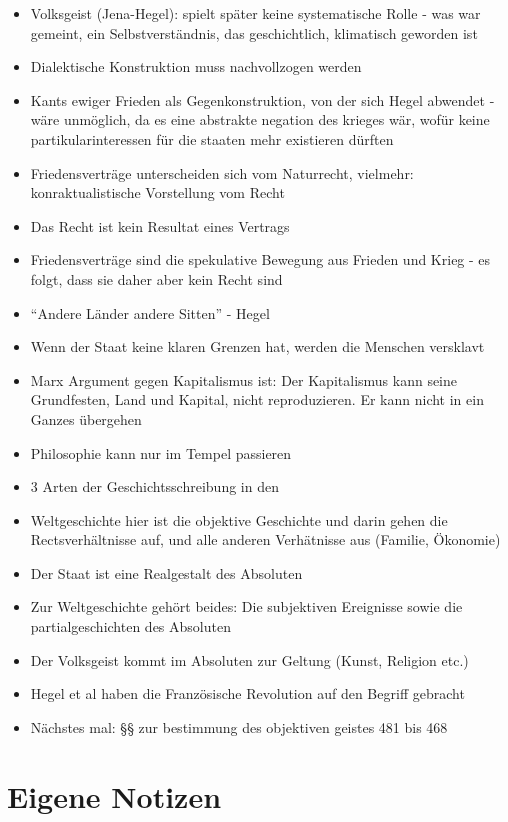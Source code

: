 \documentclass[emulatestandardclasses]{scrartcl}
\begin{document}
\begin{itemize}
  \item Volksgeist (Jena-Hegel): spielt später keine systematische Rolle - was war gemeint, ein Selbstverständnis, das geschichtlich, klimatisch geworden ist
  \item Dialektische Konstruktion muss nachvollzogen werden
  \item Kants ewiger Frieden als Gegenkonstruktion, von der sich Hegel abwendet - wäre unmöglich, da es eine abstrakte negation des krieges wär, wofür keine partikularinteressen für die staaten mehr existieren dürften
  \item Friedensverträge unterscheiden sich vom Naturrecht, vielmehr: konraktualistische Vorstellung vom Recht
  \item Das Recht ist kein Resultat eines Vertrags
  \item Friedensverträge sind die spekulative Bewegung aus Frieden und Krieg - es folgt, dass sie daher aber kein Recht sind
  \item "`Andere Länder andere Sitten"' - Hegel
  \item Wenn der Staat keine klaren Grenzen hat, werden die Menschen versklavt
  \item Marx Argument gegen Kapitalismus ist: Der Kapitalismus kann seine Grundfesten, Land und Kapital, nicht reproduzieren. Er kann nicht in ein Ganzes übergehen
  \item Philosophie kann nur im Tempel passieren
  \item 3 Arten der Geschichtsschreibung in den
  \item Weltgeschichte hier ist die objektive Geschichte und darin gehen die Rectsverhältnisse auf, und alle anderen Verhätnisse aus (Familie, Ökonomie)
  \item Der Staat ist eine Realgestalt des Absoluten
  \item Zur Weltgeschichte gehört beides: Die subjektiven Ereignisse sowie die partialgeschichten des Absoluten 
  \item Der Volksgeist kommt im Absoluten zur Geltung (Kunst, Religion etc.)
  \item Hegel et al haben die Französische Revolution auf den Begriff gebracht
  \item Nächstes mal: §§ zur bestimmung des objektiven geistes 481 bis 468
\end{itemize}


\section{Eigene Notizen}
\end{document}
